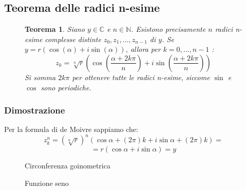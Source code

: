 \documentclass[a4paper]{article}
\newtheorem{theorem}{Teorema}
\theoremstyle{break}
\theoremstyle{break}
\theoremstyle{break}
\theoremstyle{break}
\begin{document}
\subsection{Teorema delle radici n-esime}
\begin{figure}[H]
  \begin{theorem}
    Siano \( y \in \mathbb{C} \) e \( n \in \mathbb{N} \). Esistono precisamente \( n \) radici n-esime
    complesse distinte \( z_0, z_1, \ldots, z_{n-1} \) di \( y \). Se \( y = r(\cos(\alpha)+i\sin(\alpha)) \),
    allora per \( k = 0, \ldots, n-1 \) :
    \[
      z_k = \sqrt[n]{r} \left( \cos\left(\frac{\alpha + 2k\pi}{n}\right) + i \sin\left(\frac{\alpha + 2k\pi}{n}\right) \right)
    \]
    Si somma \( 2k \pi  \) per ottenere tutte le radici n-esime, siccome \( \sin \) e \( \cos \) sono periodiche.
    \label{th:radici_n-esime}
  \end{theorem}
\end{figure}

\subsubsection{Dimostrazione}
Per la formula di de Moivre sappiamo che:
\[
  z_k^n = \left( \sqrt[n]{r} \right)^n \left( \cos{\alpha + (2 \pi )k} + i \sin{\alpha + (2 \pi )k} \right)  =
\]
\[
  = r \left( \cos{\alpha} + i \sin{\alpha} \right) = y
\]

\begin{figure}[H]
  \centering
  \caption{Circonferenza goinometrica}
\end{figure}

\begin{figure}[H]
  \centering
  \caption{Funzione seno}
\end{figure}
\end{document}
